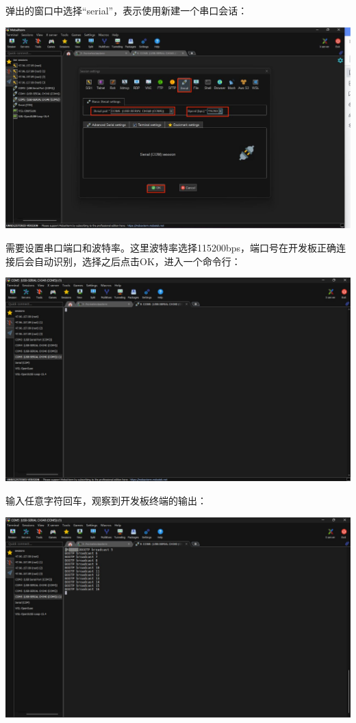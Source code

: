 {\begin{enumerate}
	
	\raggedright
	
	弹出的窗口中选择“serial”，表示使用新建一个串口会话：
	
	\centering
	\includegraphics[width=0.9\linewidth]{figures/08-02-串口设置.jpg}
	
	
	\raggedright
	
	
	需要设置串口端口和波特率。这里波特率选择115200bps，端口号在开发板正确连接后会自动识别，选择之后点击OK，进入一个命令行：
	
	\centering
	\includegraphics[width=0.9\linewidth]{figures/08-02-串口命令行.jpg}
	
	
	\raggedright
	
	输入任意字符回车，观察到开发板终端的输出：
	
	\centering
	\includegraphics[width=0.9\linewidth]{figures/08-02-串口输出.jpg}
	

\end{enumerate}}
